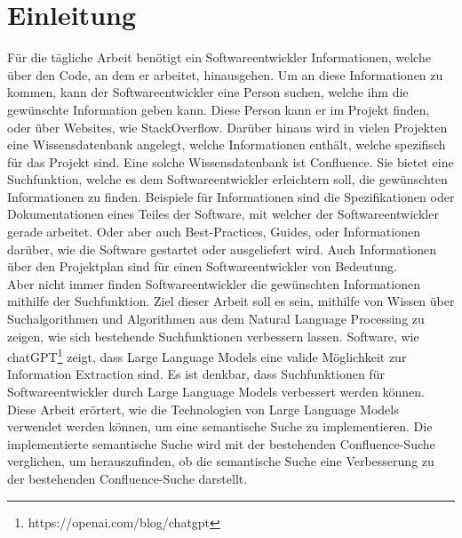\chapter{Einleitung}
Für die tägliche Arbeit benötigt ein Softwareentwickler Informationen, welche über den Code, an dem er arbeitet, hinausgehen.
Um an diese Informationen zu kommen, kann der Softwareentwickler eine Person suchen, welche ihm die gewünschte Information geben kann.
Diese Person kann er im Projekt finden, oder über Websites, wie StackOverflow.
Darüber hinaus wird in vielen Projekten eine Wissensdatenbank angelegt, welche Informationen enthält, welche spezifisch für das Projekt sind.
Eine solche Wissensdatenbank ist Confluence.
Sie bietet eine Suchfunktion, welche es dem Softwareentwickler erleichtern soll, die gewünschten Informationen zu finden.
Beispiele für Informationen sind die Spezifikationen oder Dokumentationen eines Teiles der Software, mit welcher der Softwareentwickler gerade arbeitet.
Oder aber auch Best-Practices, Guides, oder Informationen darüber, wie die Software gestartet oder ausgeliefert wird.
Auch Informationen über den Projektplan sind für einen Softwareentwickler von Bedeutung.\\

Aber nicht immer finden Softwareentwickler die gewünschten Informationen mithilfe der Suchfunktion.
Ziel dieser Arbeit soll es sein, mithilfe von Wissen über Suchalgorithmen und Algorithmen aus dem Natural Language Processing zu zeigen, wie sich bestehende Suchfunktionen verbessern lassen.
Software, wie chatGPT\footnote{https://openai.com/blog/chatgpt} zeigt, dass Large Language Models eine valide Möglichkeit zur Information Extraction sind.
Es ist denkbar, dass Suchfunktionen für Softwareentwickler durch Large Language Models verbessert werden können.
Diese Arbeit erörtert, wie die Technologien von Large Language Models verwendet werden können, um eine semantische Suche zu implementieren.
Die implementierte semantische Suche wird mit der bestehenden Confluence-Suche verglichen, um herauszufinden, ob die semantische Suche eine Verbesserung zu der bestehenden Confluence-Suche darstellt.

